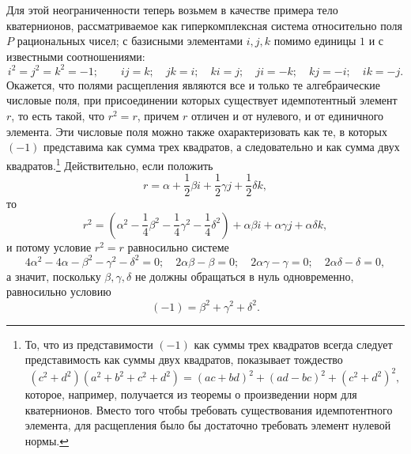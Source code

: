 \documentclass[11pt]{article}
\begin{document}
\noindent Для этой неограниченности теперь возьмем в качестве примера тело кватернионов, рассматриваемое как гиперкомплексная система относительно поля $P$ рациональных чисел; с базисными элементами $i,j,k$ помимо единицы $1$ и с известными соотношениями:
\[
 i^2=j^2=k^2=-1;\qquad ij=k;\quad jk=i;\quad ki=j;\quad ji=-k;\quad kj=-i;\quad ik=-j.
\]
Окажется, что полями расщепления являются все и только те алгебраические числовые поля, при присоединении которых существует идемпотентный элемент $r$, то есть такой, что $r^2=r$, причем $r$ отличен и от нулевого, и от единичного элемента. Эти числовые поля можно также охарактеризовать как те, в которых $(-1)$ представима как сумма трех квадратов, а следовательно и как сумма двух квадратов.\footnote{То, что из представимости $(-1)$ как суммы трех квадратов всегда следует представимость как суммы двух квадратов, показывает тождество
\[
(c^2+d^2)(a^2+b^2+c^2+d^2)=(ac+bd)^2+(ad-bc)^2+(c^2+d^2)^2,
\]
которое, например, получается из теоремы о произведении норм для кватернионов. Вместо того чтобы требовать существования идемпотентного элемента, для расщепления было бы достаточно требовать элемент нулевой нормы.} Действительно, если положить
\[
        r=\alpha+\frac12\beta i+\frac12\gamma j+\frac12\delta k,
\]
то
\[
        r^2=\left(\alpha^2-\frac14\beta^2-\frac14\gamma^2-\frac14\delta^2\right)
          +\alpha\beta i+\alpha\gamma j+\alpha\delta k,
\]
и потому условие $r^2=r$ равносильно системе
\[
4\alpha^2-4\alpha-\beta^2-\gamma^2-\delta^2=0;\quad
2\alpha\beta-\beta=0;\quad 2\alpha\gamma-\gamma=0;\quad 2\alpha\delta-\delta=0,
\]
а значит, поскольку $\beta,\gamma,\delta$ не должны обращаться в нуль одновременно, равносильно условию
\[
        (-1)=\beta^2+\gamma^2+\delta^2.
\]
\end{document}

